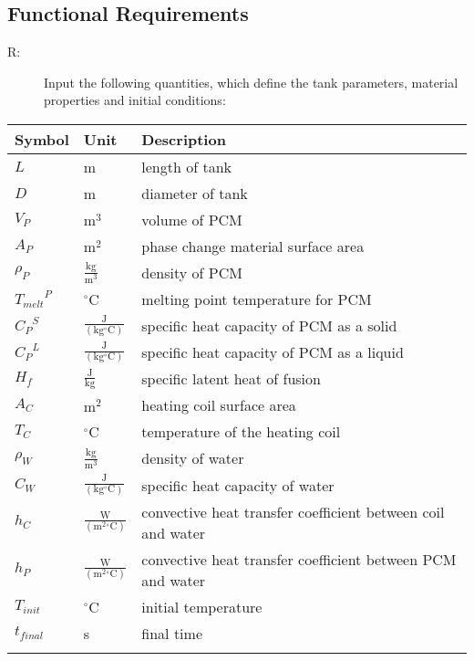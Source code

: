 \documentclass[12pt]{article}
\newcounter{reqnum}
\newcommand{\rthereqnum}{R\thereqnum}
\begin{document}
\subsection{Functional Requirements}
\label{Sec:FRs}
\begin{description}
\item[\rthereqnum\label{FR:Input-Initial-Quantities}:]Input the following quantities, which define the tank parameters, material properties and initial conditions:
\end{description}
\begin{longtabu}{l l X[l]}
\toprule
Symbol & Unit & Description
\\
\midrule
$L$ & m & length of tank
\\
$D$ & m & diameter of tank
\\
${V_{P}}$ & $\text{m}^{3}$ & volume of PCM
\\
${A_{P}}$ & $\text{m}^{2}$ & phase change material surface area
\\
${ρ_{P}}$ & $\frac{\text{kg}}{\text{m}^{3}}$ & density of PCM
\\
${{T_{melt}}^{P}}$ & ${}^{\circ}$C & melting point temperature for PCM
\\
${{C_{P}}^{S}}$ & $\frac{\text{J}}{(\text{kg}{}^{\circ}\text{C})}$ & specific heat capacity of PCM as a solid
\\
${{C_{P}}^{L}}$ & $\frac{\text{J}}{(\text{kg}{}^{\circ}\text{C})}$ & specific heat capacity of PCM as a liquid
\\
${H_{f}}$ & $\frac{\text{J}}{\text{kg}}$ & specific latent heat of fusion
\\
${A_{C}}$ & $\text{m}^{2}$ & heating coil surface area
\\
${T_{C}}$ & ${}^{\circ}$C & temperature of the heating coil
\\
${ρ_{W}}$ & $\frac{\text{kg}}{\text{m}^{3}}$ & density of water
\\
${C_{W}}$ & $\frac{\text{J}}{(\text{kg}{}^{\circ}\text{C})}$ & specific heat capacity of water
\\
${h_{C}}$ & $\frac{\text{W}}{(\text{m}^{2}{}^{\circ}\text{C})}$ & convective heat transfer coefficient between coil and water
\\
${h_{P}}$ & $\frac{\text{W}}{(\text{m}^{2}{}^{\circ}\text{C})}$ & convective heat transfer coefficient between PCM and water
\\
${T_{init}}$ & ${}^{\circ}$C & initial temperature
\\
${t_{final}}$ & s & final time
\\
\bottomrule
\label{Table:InConstraints}
\end{longtabu}
\end{document}
